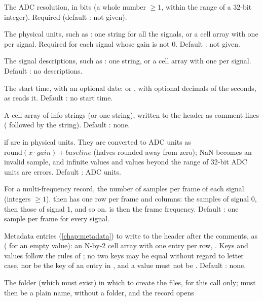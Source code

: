 \begin{params}
\item[adcres] The ADC resolution, in bits (a whole number $\ge 1$, within the range of a
  32-bit integer). Required (default \code{[]}: not given).
\item[units] The physical units, such as : one string for all the signals, or a
  cell array with one per signal. Required for each signal whose gain is not 0. Default
  \code{[]}: not given.
\item[names] The signal descriptions, such as : one string, or a cell array
  with one per signal. Default \code{[]}: no descriptions.
\item[base\_time] The start time, with an optional date:  or
  , with optional decimals of the seconds, as
   reads it. Default \code{[]}: no start time.
\item[comments] A cell array of info strings (or one string), written to the header as
  comment lines (\code{\#} followed by the string). Default \code{[]}: none.
\item[physical]  if  are in physical units. They are converted to
  ADC units as $\mathrm{round}(x \cdot \mathit{gain}) + \mathit{baseline}$ (halves rounded
  away from zero); NaN becomes an invalid sample, and infinite values and values beyond
  the range of 32-bit ADC units are errors. Default : ADC units.
\item[samps\_per\_frame] For a multi-frequency record, the number of samples per frame of
  each signal (integers $\ge 1$).  then has one row per frame and
   columns: the samples of signal 0, then those of signal 1,
  and so on.  is then the frame frequency. Default \code{[]}: one sample per
  frame for every signal.
\item[metadata] Metadata entries (\cref{chap:metadata}) to write to the header after the
  comments, as  ( for an empty value): an N-by-2 cell
  array with one entry per row, . Keys and values follow the
  rules of ; no two keys may be equal without regard to letter
  case, nor be the key of an entry in , and a value must not be
  \code{[]}. Default \code{[]}: none.
\item[dir] The folder (which must exist) in which to create the files, for this call
  only;  must then be a plain name, without a folder, and the record opens

\end{params}
